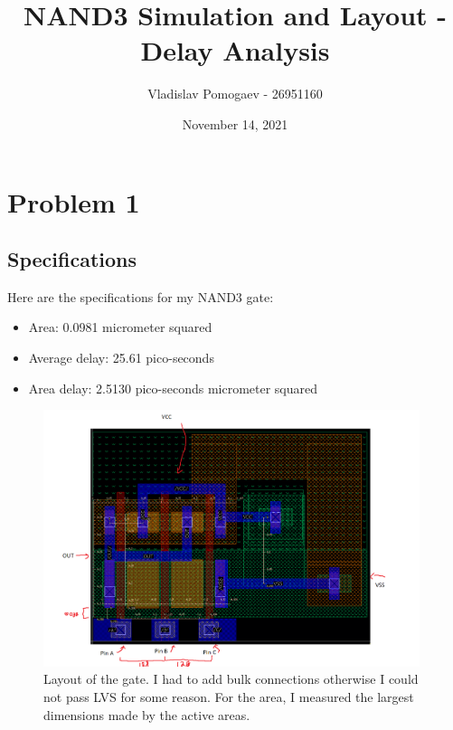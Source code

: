 \documentclass[11pt]{article}
\title{NAND3 Simulation and Layout - Delay Analysis}
\author{Vladislav Pomogaev - 26951160}
\date{November 14, 2021}
\begin{document}
\maketitle

\section{Problem 1}
\subsection{Specifications}
Here are the specifications for my NAND3 gate:
\begin{itemize}
\item Area: 0.0981 micrometer squared
\item Average delay: 25.61 pico-seconds
\item Area delay: 2.5130 pico-seconds micrometer squared
\end{itemize}

\begin{figure}[H]
	\includegraphics[width=0.98\textwidth]{layout_annot.png}
  	\caption{Layout of the gate. I had to add bulk connections otherwise I could not pass LVS for some reason. For the area, I measured the largest dimensions made by the active areas.}
\end{figure}
\end{document}
